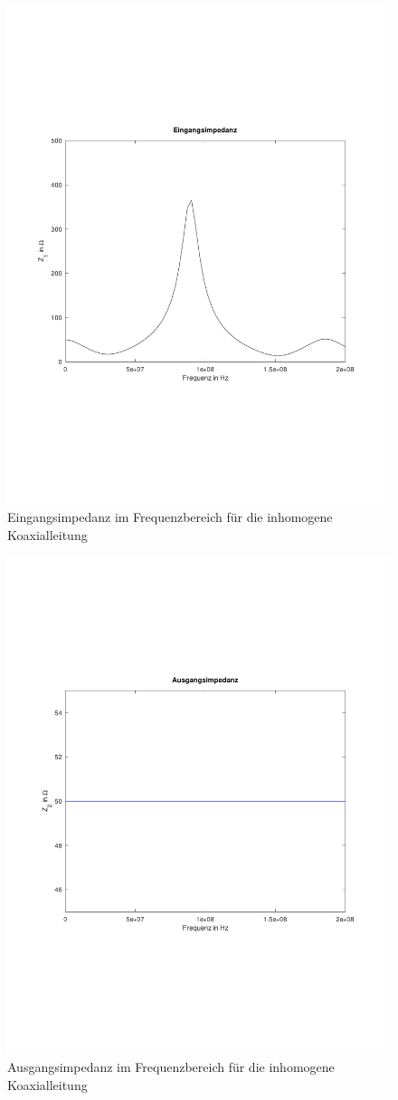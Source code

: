 \documentclass[Protokollheft.tex]{subfiles}
\begin{document}
\begin{figure}
	\centering
	\includegraphics[trim = 15mm 65mm 15mm 65mm, clip,width=0.7\linewidth]{inhomo_3}
	\caption{Eingangsimpedanz im Frequenzbereich für die inhomogene Koaxialleitung}
	\label{fig:inhomo_3}
\end{figure}
\begin{figure}
	\centering
	\includegraphics[trim = 15mm 65mm 15mm 65mm, clip,width=0.7\linewidth]{inhomo_4}
	\caption{Ausgangsimpedanz im Frequenzbereich für die inhomogene Koaxialleitung}
	\label{fig:inhomo_4}
\end{figure}
\end{document}
